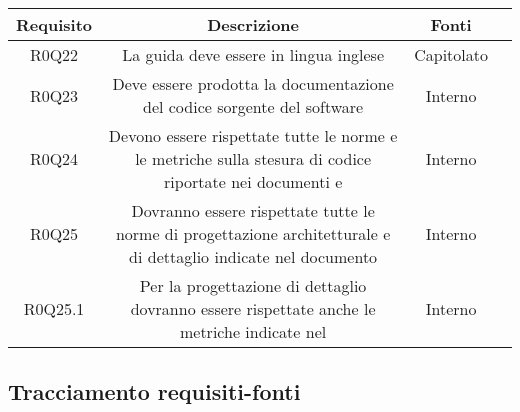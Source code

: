 \begin{center}
\begin{longtable}{|c|c|c|c|}
\hline

\textbf{Requisito} & \textbf{Descrizione} & \textbf{Fonti} \\
\hline
R0Q22  & \parbox[t]{\larghezza}{La guida deve essere in lingua inglese}  & \parbox[t]{\dimFonti}{ Capitolato \\} \\
\hline
R0Q23  & \parbox[t]{\larghezza}{Deve essere prodotta la documentazione del codice sorgente del software }  & \parbox[t]{\dimFonti}{ Interno \\} \\
\hline
R0Q24  & \parbox[t]{\larghezza}{Devono essere rispettate tutte le norme e le metriche sulla stesura di codice riportate nei documenti \NdP{} e \PdQ{}
}  & \parbox[t]{\dimFonti}{ Interno \\} \\
\hline
R0Q25  & \parbox[t]{\larghezza}{Dovranno essere rispettate tutte le norme di progettazione architetturale e di dettaglio indicate nel documento \NdP{}}  & \parbox[t]{\dimFonti}{ Interno \\} \\
\hline
R0Q25.1  & \parbox[t]{\larghezza}{Per la progettazione di dettaglio dovranno essere rispettate anche le metriche indicate nel \PdP{}
}  & \parbox[t]{\dimFonti}{ Interno \\} \\
\hline
\end{longtable}
\end{center}

\subsection{Tracciamento requisiti-fonti}
\label{tracciamentorequisitifonti}

